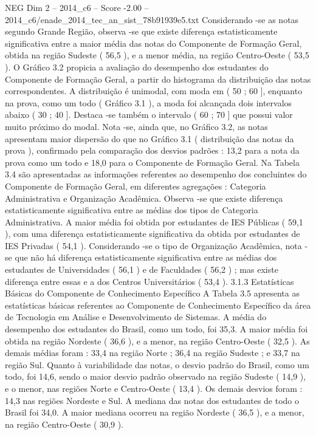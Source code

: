 \begin{textsample}{NEG Dim 2 – 2014\_c6 – Score -2.00 – 2014\_c6/enade\_2014\_tec\_an\_sist\_78b91939e5.txt}
Considerando -se as notas segundo Grande Região, observa -se que existe diferença estatisticamente significativa entre a maior média das notas do Componente de Formação Geral, obtida na região Sudeste ( 56,5 ), e a menor média, na região Centro-Oeste ( 53,5 ).
O Gráfico 3.2 propicia a avaliação do desempenho dos estudantes do Componente de Formação Geral, a partir do histograma da distribuição das notas correspondentes.
A distribuição é unimodal, com moda em ( 50 ; 60 ], enquanto na prova, como um todo ( Gráfico 3.1 ), a moda foi alcançada dois intervalos abaixo ( 30 ; 40 ].
Destaca -se também o intervalo ( 60 ; 70 ] que possui valor muito próximo do modal.
Nota -se, ainda que, no Gráfico 3.2, as notas apresentam maior dispersão do que no Gráfico 3.1 ( distribuição das notas da prova ), confirmado pela comparação dos desvios padrões : 13,2 para a nota da prova como um todo e 18,0 para o Componente de Formação Geral.
Na Tabela 3.4 são apresentadas as informações referentes ao desempenho dos concluintes do Componente de Formação Geral, em diferentes agregações : Categoria Administrativa e Organização Acadêmica.
Observa -se que existe diferença estatisticamente significativa entre as médias dos tipos de Categoria Administrativa.
A maior média foi obtida por estudantes de IES Públicas ( 59,1 ), com uma diferença estatisticamente significativa da obtida por estudantes de IES Privadas ( 54,1 ).
Considerando -se o tipo de Organização Acadêmica, nota -se que não há diferença estatisticamente significativa entre as médias dos estudantes de Universidades ( 56,1 ) e de Faculdades ( 56,2 ) ; mas existe diferença entre essas e a dos Centros Universitários ( 53,4 ). 3.1.3 Estatísticas Básicas do Componente de Conhecimento Específico A Tabela 3.5 apresenta as estatísticas básicas referentes ao Componente de Conhecimento Específico da área de Tecnologia em Análise e Desenvolvimento de Sistemas.
A média do desempenho dos estudantes do Brasil, como um todo, foi 35,3.
A maior média foi obtida na região Nordeste ( 36,6 ), e a menor, na região Centro-Oeste ( 32,5 ).
As demais médias foram : 33,4 na região Norte ; 36,4 na região Sudeste ; e 33,7 na região Sul.
Quanto à variabilidade das notas, o desvio padrão do Brasil, como um todo, foi 14,6, sendo o maior desvio padrão observado na região Sudeste ( 14,9 ), e o menor, nas regiões Norte e Centro-Oeste ( 13,4 ).
Os demais desvios foram : 14,3 nas regiões Nordeste e Sul.
A mediana das notas dos estudantes de todo o Brasil foi 34,0.
A maior mediana ocorreu na região Nordeste ( 36,5 ), e a menor, na região Centro-Oeste ( 30,9 ).

\end{textsample}
